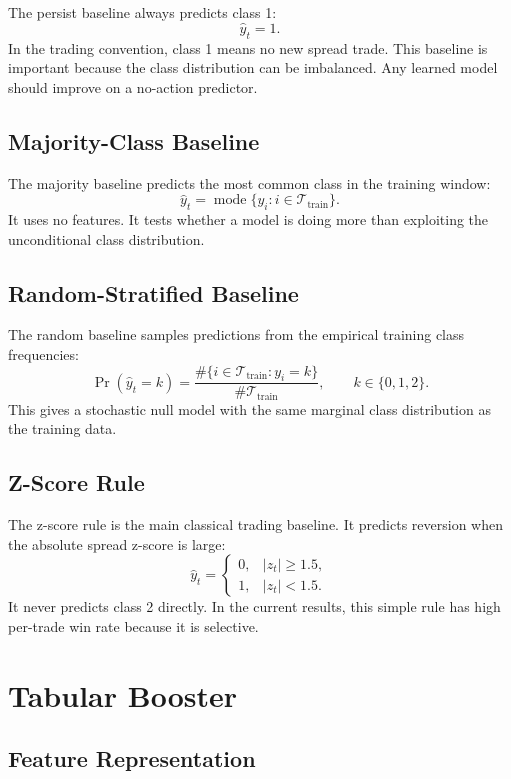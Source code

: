 \documentclass[11pt]{article}
\begin{document}
The persist baseline always predicts class 1:
\[
\hat{y}_t = 1.
\]
In the trading convention, class 1 means no new spread trade. This baseline is
important because the class distribution can be imbalanced. Any learned model
should improve on a no-action predictor.

\subsection{Majority-Class Baseline}

The majority baseline predicts the most common class in the training window:
\[
\hat{y}_t = \operatorname{mode}\{y_i : i \in \mathcal{T}_{\text{train}}\}.
\]
It uses no features. It tests whether a model is doing more than exploiting
the unconditional class distribution.

\subsection{Random-Stratified Baseline}

The random baseline samples predictions from the empirical training class
frequencies:
\[
\Pr(\hat{y}_t=k) =
\frac{\#\{i \in \mathcal{T}_{\text{train}} : y_i=k\}}
{\#\mathcal{T}_{\text{train}}}, \qquad k \in \{0,1,2\}.
\]
This gives a stochastic null model with the same marginal class distribution
as the training data.

\subsection{Z-Score Rule}

The z-score rule is the main classical trading baseline. It predicts
reversion when the absolute spread z-score is large:
\[
\hat{y}_t =
\begin{cases}
0, & |z_t| \geq 1.5,\\
1, & |z_t| < 1.5.
\end{cases}
\]
It never predicts class 2 directly. In the current results, this simple rule
has high per-trade win rate because it is selective.

\section{Tabular Booster}

\subsection{Feature Representation}
\end{document}
